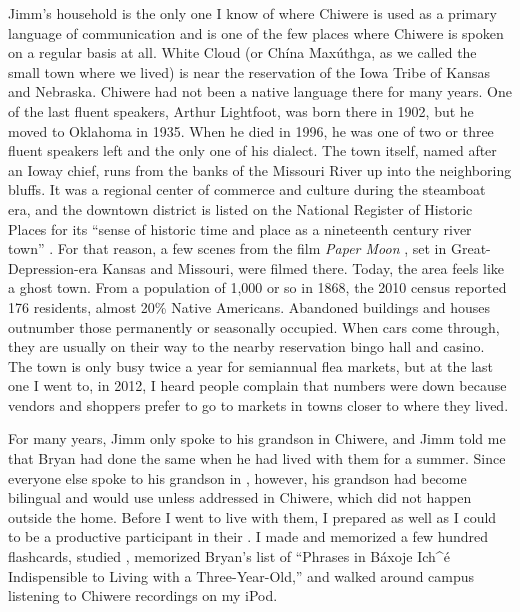 \documentclass[output=paper]{LSP/langsci}
\begin{document}
Jimm's household is the only one I know of where Chiwere is used as a primary language of communication and is one of the few places where Chiwere is spoken on a regular basis at all. White Cloud (or Chína Maxúthga, as we called the small town where we lived) is near the reservation of the Iowa Tribe of Kansas and Nebraska. Chiwere had not been a native language there for many years. One of the last fluent speakers, Arthur Lightfoot, was born there in 1902, but he moved to Oklahoma in 1935. When he died in 1996, he was one of two or three fluent speakers left and the only one of his dialect. The town itself, named after an Ioway chief, runs from the banks of the Missouri River up into the neighboring bluffs. It was a regional center of commerce and culture during the steamboat era, and the downtown district is listed on the National Register of Historic Places for its ``sense of historic time and place as a nineteenth century river town'' \citep[1]{Wolfenbarger1996}. For that reason, a few scenes from the film \emph{Paper Moon} \citep{Bogdanovich1973}, set in Great-Depression-era Kansas and Missouri, were filmed there. Today, the area feels like a ghost town. From a population of 1,000 or so in 1868, the 2010 census reported 176 residents, almost 20\% Native Americans. Abandoned buildings and houses outnumber those permanently or seasonally occupied. When cars come through, they are usually on their way to the nearby reservation bingo hall and casino. The town is only busy twice a year for semiannual flea markets, but at the last one I went to, in 2012, I heard people complain that numbers were down because vendors and shoppers prefer to go to markets in towns closer to where they lived.

For many years, Jimm only spoke to his grandson in Chiwere, and Jimm told me that Bryan had done the same when he had lived with them for a summer. Since everyone else spoke to his grandson in , however, his grandson had become bilingual and would use  unless addressed in Chiwere, which did not happen outside the home. Before I went to live with them, I prepared as well as I could to be a productive participant in their . I made and memorized a few hundred flashcards, studied , memorized Bryan's list of ``Phrases in Báxoje Ich\^{ }é Indispensible to Living with a Three-Year-Old,'' and walked around campus listening to Chiwere recordings on my iPod.
\end{document}
